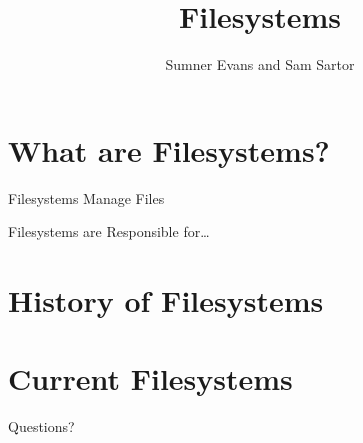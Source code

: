 \documentclass{lug}
\title{Filesystems}
\author{Sumner Evans and Sam Sartor}
\institute{Mines Linux Users Group}
\begin{document}
\section{What are Filesystems?}

\begin{frame}{Filesystems Manage Files}
\end{frame}

\begin{frame}{Filesystems are Responsible for\ldots}
\end{frame}

\section{History of Filesystems}

\section{Current Filesystems}

\begin{frame}[standout]
    \Huge
    Questions?
\end{frame}
\end{document}
